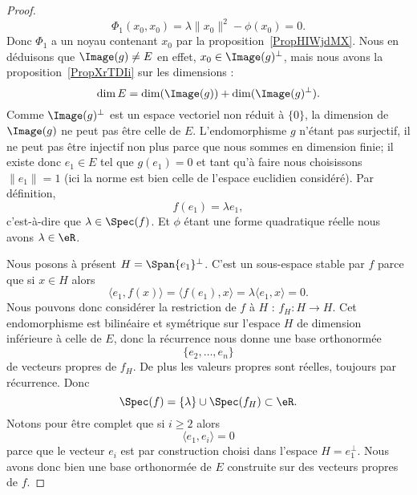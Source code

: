 \begin{proof}
	\begin{equation}
		\Phi_1(x_0,x_0)=\lambda\| x_0 \|^2-\phi(x_0)=0.
	\end{equation}
	Donc \( \Phi_1\) a un noyau contenant \( x_0\) par la proposition~\ref{PropHIWjdMX}. Nous en déduisons que \( \Image(g)\neq E\) en effet, \( x_0\in\Image(g)^{\perp}\), mais nous avons la proposition~\ref{PropXrTDIi} sur les dimensions :
	\begin{equation}
		\dim E=\dim(\Image(g))+\dim( \Image(g)^{\perp}).
	\end{equation}
	Comme \( \Image(g)^{\perp}\) est un espace vectoriel non réduit à \( \{ 0 \}\), la dimension de \( \Image(g)\) ne peut pas être celle de \( E\). L'endomorphisme \( g\) n'étant pas surjectif, il ne peut pas être injectif non plus parce que nous sommes en dimension finie; il existe donc \( e_1\in E\) tel que \( g(e_1)=0\) et tant qu'à faire nous choisissons \( \| e_1 \|=1\) (ici la norme est bien celle de l'espace euclidien considéré). Par définition,
	\begin{equation}
		f(e_1)=\lambda e_1,
	\end{equation}
	c'est-à-dire que \( \lambda\in\Spec(f)\). Et \( \phi\) étant une forme quadratique réelle nous avons \( \lambda\in \eR\).

	Nous posons à présent \( H=\Span\{ e_1 \}^{\perp}\). C'est un sous-espace stable par \( f\) parce que si \( x\in H\) alors
	\begin{equation}
		\langle e_1, f(x)\rangle =\langle f(e_1),x\rangle =\lambda\langle e_1, x\rangle =0.
	\end{equation}
	Nous pouvons donc considérer la restriction de \( f\) à \( H\) : \( f_H\colon H\to H\). Cet endomorphisme est bilinéaire et symétrique sur l'espace \( H\) de dimension inférieure à celle de \( E\), donc la récurrence nous donne une base orthonormée
	\begin{equation}
		\{ e_2,\ldots, e_n \}
	\end{equation}
	de vecteurs propres de \( f_H\). De plus les valeurs propres sont réelles, toujours par récurrence. Donc
	\begin{equation}
		\Spec(f)=\{ \lambda \}\cup\Spec(f_H)\subset \eR.
	\end{equation}
	Notons pour être complet que si \( i\geq 2\) alors
	\begin{equation}
		\langle e_1, e_i\rangle =0
	\end{equation}
	parce que le vecteur \( e_i\) est par construction choisi dans l'espace \( H=e_1^{\perp}\). Nous avons donc bien une base orthonormée de \( E\) construite sur des vecteurs propres de \( f\).
\end{proof}


